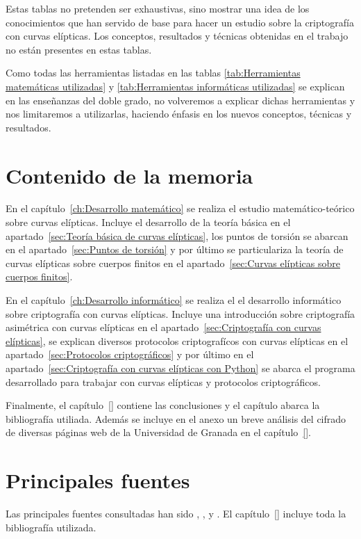 Estas tablas no pretenden ser exhaustivas, sino mostrar una idea de los conocimientos que han servido de base para hacer un estudio sobre la criptografía con curvas elípticas. Los conceptos, resultados y técnicas obtenidas en el trabajo no están presentes en estas tablas.

Como todas las herramientas listadas en las tablas \ref{tab:Herramientas matemáticas utilizadas} y \ref{tab:Herramientas informáticas utilizadas} se explican en las enseñanzas del doble grado, no volveremos a explicar dichas herramientas y nos limitaremos a utilizarlas, haciendo énfasis en los nuevos conceptos, técnicas y resultados.


\section{Contenido de la memoria}
\label{sub:Contenido de la memoria}


En el capítulo~\ref{ch:Desarrollo matemático} se realiza el estudio matemático-teórico sobre curvas elípticas. Incluye el desarrollo de la teoría básica en el apartado~\ref{sec:Teoría básica de curvas elípticas}, los puntos de torsión se abarcan en el apartado~\ref{sec:Puntos de torsión} y por último se particulariza la teoría de curvas elípticas sobre cuerpos finitos en el apartado~\ref{sec:Curvas elípticas sobre cuerpos finitos}.

En el capítulo~\ref{ch:Desarrollo informático} se realiza el el desarrollo informático sobre criptografía con curvas elípticas. Incluye una introducción sobre criptografía asimétrica con curvas elípticas en el apartado~\ref{sec:Criptografía con curvas elípticas}, se explican diversos protocolos criptografícos con curvas elípticas en el apartado~\ref{sec:Protocolos criptográficos} y por último en el apartado~\ref{sec:Criptografía con curvas elípticas con Python} se abarca el programa desarrollado para trabajar con curvas elípticas y protocolos criptográficos.

Finalmente, el capítulo~\ref{} contiene las conclusiones y el capítulo abarca la bibliografía utiliada. Además se incluye en el anexo un breve análisis del cifrado
de diversas páginas web de la Universidad de Granada en el capítulo~\ref{}.


\section{Principales fuentes}
\label{sub:Principales fuentes}

Las principales fuentes consultadas han sido \cite{Washington:2008}, \cite{Hankerson:2003}, \cite{Silverman:2009} y \cite{Menezes:1996}. El capítulo~\ref{} incluye toda la bibliografía utilizada.
